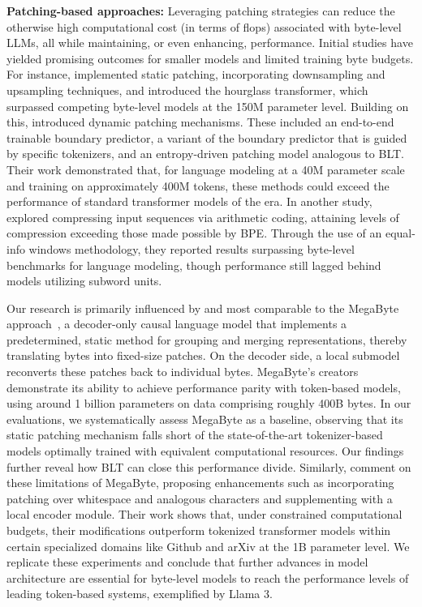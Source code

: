 \textbf{Patching-based approaches:} Leveraging patching strategies can reduce the otherwise high computational cost (in terms of flops) associated with byte-level LLMs, all while maintaining, or even enhancing, performance. Initial studies have yielded promising outcomes for smaller models and limited training byte budgets. For instance, \cite{nawrot-etal-2022-hierarchical} implemented static patching, incorporating downsampling and upsampling techniques, and introduced the hourglass transformer, which surpassed competing byte-level models at the 150M parameter level. Building on this, \cite{nawrot-etal-2023-efficient} introduced dynamic patching mechanisms. These included an end-to-end trainable boundary predictor, a variant of the boundary predictor that is guided by specific tokenizers, and an entropy-driven patching model analogous to {\textsc BLT}. Their work demonstrated that, for language modeling at a 40M parameter scale and training on approximately 400M tokens, these methods could exceed the performance of standard transformer models of the era. In another study, \cite{lester2024training} explored compressing input sequences via arithmetic coding, attaining levels of compression exceeding those made possible by BPE. Through the use of an equal-info windows methodology, they reported results surpassing byte-level benchmarks for language modeling, though performance still lagged behind models utilizing subword units.

Our research is primarily influenced by and most comparable to the MegaByte approach~\citep{yu2023megabyte}, a decoder-only causal language model that implements a predetermined, static method for grouping and merging representations, thereby translating bytes into fixed-size patches. On the decoder side, a local submodel reconverts these patches back to individual bytes. MegaByte's creators demonstrate its ability to achieve performance parity with token-based models, using around 1 billion parameters on data comprising roughly 400B bytes. In our evaluations, we systematically assess MegaByte as a baseline, observing that its static patching mechanism falls short of the state-of-the-art tokenizer-based models optimally trained with equivalent computational resources. Our findings further reveal how {\textsc BLT} can close this performance divide. Similarly, \cite{slagle2024spacebyte} comment on these limitations of MegaByte, proposing enhancements such as incorporating patching over whitespace and analogous characters and supplementing with a local encoder module. Their work shows that, under constrained computational budgets, their modifications outperform tokenized transformer models within certain specialized domains like Github and arXiv at the 1B parameter level. We replicate these experiments and conclude that further advances in model architecture are essential for byte-level models to reach the performance levels of leading token-based systems, exemplified by Llama 3.

